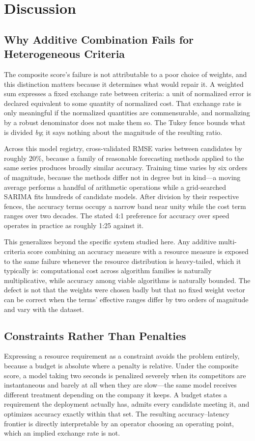 \section{Discussion}
\label{sec:discussion}

\subsection{Why Additive Combination Fails for Heterogeneous Criteria}
The composite score's failure is not attributable to a poor choice of weights, and this distinction matters because it determines what would repair it. A weighted sum expresses a fixed exchange rate between criteria: a unit of normalized error is declared equivalent to some quantity of normalized cost. That exchange rate is only meaningful if the normalized quantities are commensurable, and normalizing by a robust denominator does not make them so. The Tukey fence bounds what is divided \emph{by}; it says nothing about the magnitude of the resulting ratio.

Across this model registry, cross-validated RMSE varies between candidates by roughly 20\%, because a family of reasonable forecasting methods applied to the same series produces broadly similar accuracy. Training time varies by six orders of magnitude, because the methods differ not in degree but in kind---a moving average performs a handful of arithmetic operations while a grid-searched SARIMA fits hundreds of candidate models. After division by their respective fences, the accuracy terms occupy a narrow band near unity while the cost term ranges over two decades. The stated 4:1 preference for accuracy over speed operates in practice as roughly 1:25 against it.

This generalizes beyond the specific system studied here. Any additive multi-criteria score combining an accuracy measure with a resource measure is exposed to the same failure whenever the resource distribution is heavy-tailed, which it typically is: computational cost across algorithm families is naturally multiplicative, while accuracy among viable algorithms is naturally bounded. The defect is not that the weights were chosen badly but that no fixed weight vector can be correct when the terms' effective ranges differ by two orders of magnitude and vary with the dataset.

\subsection{Constraints Rather Than Penalties}
Expressing a resource requirement as a constraint avoids the problem entirely, because a budget is absolute where a penalty is relative. Under the composite score, a model taking two seconds is penalized severely when its competitors are instantaneous and barely at all when they are slow---the same model receives different treatment depending on the company it keeps. A budget states a requirement the deployment actually has, admits every candidate meeting it, and optimizes accuracy exactly within that set. The resulting accuracy--latency frontier is directly interpretable by an operator choosing an operating point, which an implied exchange rate is not.

